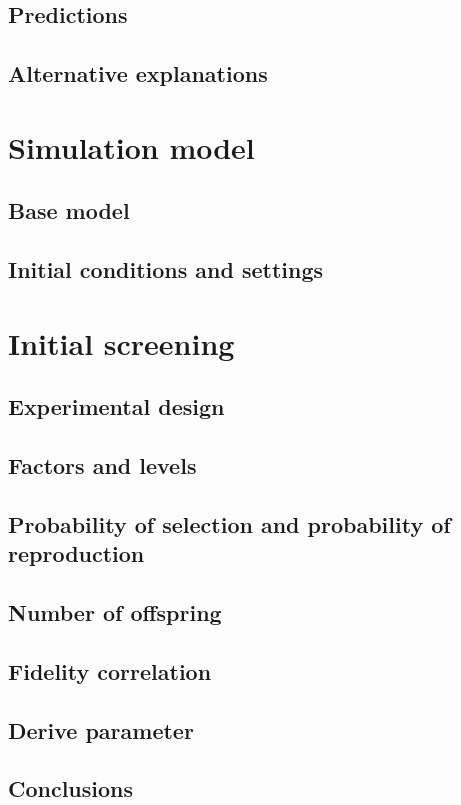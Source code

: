 \documentclass[]{report}
\begin{document}
\section{Predictions}
\section{Alternative explanations}

\chapter{Simulation model}
\section{Base model}
\section{Initial conditions and settings}

\chapter{Initial screening}
\section{Experimental design}
\section{Factors and levels}
\section{Probability of selection and probability of reproduction}
\section{Number of offspring}
\section{Fidelity correlation}
\section{Derive parameter}
\section{Conclusions}
\end{document}
